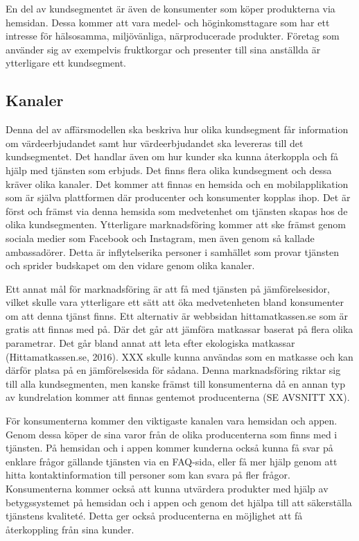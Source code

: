 \documentclass[10pt,a4paper,oneside]{article}
\begin{document}
En del av kundsegmentet är även de konsumenter som köper produkterna via hemsidan. Dessa kommer att vara medel- och höginkomsttagare som har ett intresse för hälsosamma, miljövänliga, närproducerade produkter. Företag som använder sig av exempelvis fruktkorgar och presenter till sina anställda är ytterligare ett kundsegment. 

\subsection{Kanaler}
Denna del av affärsmodellen ska beskriva hur olika kundsegment får information om värdeerbjudandet samt hur värdeerbjudandet ska levereras till det kundsegmentet. Det handlar även om hur kunder ska kunna återkoppla och få hjälp med tjänsten som erbjuds. Det finns flera olika kundsegment och dessa kräver olika kanaler. Det kommer att finnas en hemsida och en mobilapplikation som är själva plattformen där producenter och konsumenter kopplas ihop. Det är först och främst via denna hemsida som medvetenhet om tjänsten skapas hos de olika kundsegmenten. Ytterligare marknadsföring kommer att ske främst genom sociala medier som Facebook och Instagram, men även genom så kallade ambassadörer. Detta är inflytelserika personer i samhället som provar tjänsten och sprider budskapet om den vidare genom olika kanaler.

Ett annat mål för marknadsföring är att få med tjänsten på jämförelsesidor, vilket skulle vara ytterligare ett sätt att öka medvetenheten bland konsumenter om att denna tjänst finns. Ett alternativ är webbsidan hittamatkassen.se som är gratis att finnas med på. Där det går att jämföra matkassar baserat på flera olika parametrar. Det går bland annat att leta efter ekologiska matkassar (Hittamatkassen.se, 2016). XXX skulle kunna användas som en matkasse och kan därför platsa på en jämförelsesida för sådana. Denna marknadsföring riktar sig till alla kundsegmenten, men kanske främst till konsumenterna då en annan typ av kundrelation kommer att finnas gentemot producenterna (SE AVSNITT XX). 

För konsumenterna kommer den viktigaste kanalen vara hemsidan och appen. Genom dessa köper de sina varor från de olika producenterna som finns med i tjänsten. På hemsidan och i appen kommer kunderna också kunna få svar på enklare frågor gällande tjänsten via en FAQ-sida, eller få mer hjälp genom att hitta kontaktinformation till personer som kan svara på fler frågor. Konsumenterna kommer också att kunna utvärdera produkter med hjälp av betygssystemet på hemsidan och i appen och genom det hjälpa till att säkerställa tjänstens kvaliteté. Detta ger också producenterna en möjlighet att få återkoppling från sina kunder. 
\end{document}
